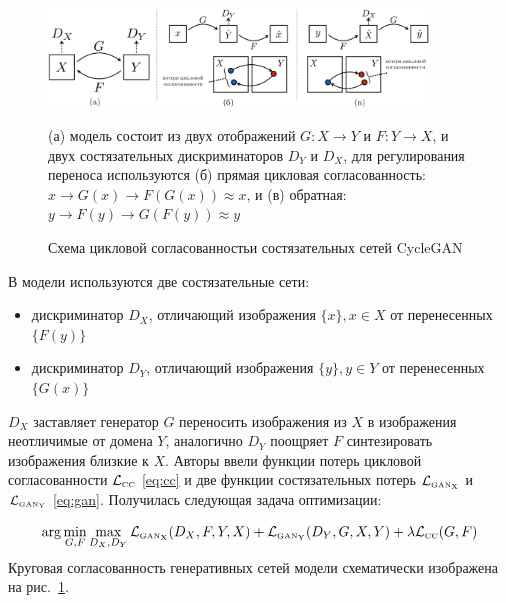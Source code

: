 \documentclass[11pt,a4paper]{extarticle}
\begin{document}
			\begin{figure}[ht]
				\centering
				\includegraphics[width=0.9\textwidth]{img/cyclegan}
				\caption{Схема цикловой согласованностьи состязательных сетей CycleGAN}{
					\small{
						(а) модель состоит из двух отображений \(G: X \rightarrow Y\) и \(F: Y \rightarrow X\), и двух состязательных дискриминаторов \(D_Y\) и \(D_X\),
						для регулирования переноса используются (б) прямая цикловая согласованность: \(x \rightarrow G(x) \rightarrow F(G(x)) \approx x \),
						и (в) обратная: \(y \rightarrow F(y) \rightarrow G(F(y)) \approx y \)
					}}
				\label{pic:cyclegan}
			\end{figure}
			\newpage\noindent 
			В модели используются две состязательные сети:
			\begin{itemize}
				\setlength\parskip{0pt}
				\vspace{-0.5em}
				\item дискриминатор \(D_X\), отличающий изображения \(\{x\}, x \in X\) от перенесенных \(\{F(y)\}\)
				\item дискриминатор \(D_Y\), отличающий изображения \(\{y\}, y \in Y\) от перенесенных \(\{G(x)\}\)
			\end{itemize}
			\(D_X\) заставляет генератор \(G\) переносить изображения из \(X\) в изображения неотличимые от домена \(Y\), аналогично \(D_Y\) поощряет \(F\) синтезировать изображения близкие к \(X\).
			Авторы ввели функции потерь цикловой согласованности \(\mathcal{L}_{\text{\tiny CC}}\) \eqref{eq:cc} и две функции состязательных потерь \(\mathcal{L}_{\text{\tiny GAN}_{\text{\tiny X}}}\) и \(\mathcal{L}_{\text{\tiny GAN}_{\text{\tiny Y}}}\) \eqref{eq:gan}.
			Получилась следующая задача оптимизации:

			\begin{equation}\label{eq:cyclegan}
				\arg\min_{G, F}\max_{D_X, D_Y}\mathcal{L}_{\text{\tiny GAN}_{\text{\tiny X}}}(D_X,F,Y,X) + \mathcal{L}_{\text{\tiny GAN}_{\text{\tiny Y}}}(D_Y,G,X,Y) + \lambda\mathcal{L}_{\text{\tiny CC}}(G,F)
			\end{equation}
			Круговая согласованность генеративных сетей модели схематически изображена на рис.~\ref{pic:cyclegan}.
\end{document}
